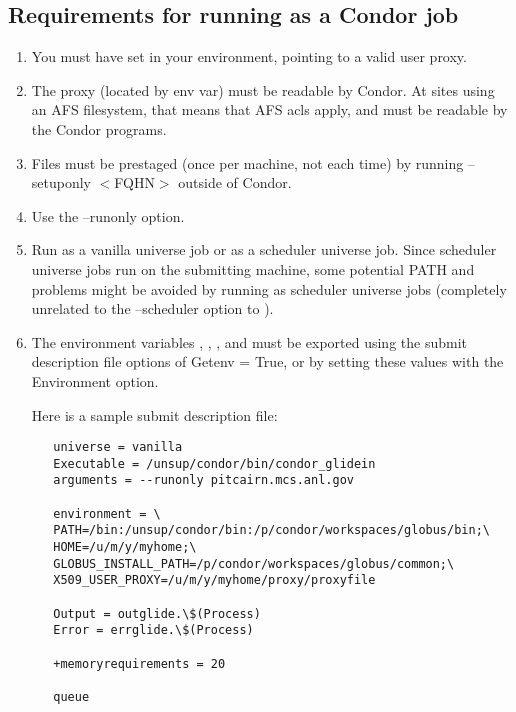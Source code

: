 \subsection{Requirements for running  as a Condor job}
\begin{enumerate}
\item You must have  set in your environment, pointing to a valid user proxy.

\item The proxy (located by  env var) must be readable by
Condor. At sites using an AFS filesystem, that means that AFS acls apply, and must be readable by the Condor programs.

\item Files must be prestaged (once per machine, not each time) by running
 --setuponly $<$FQHN$>$ outside of Condor.

\item Use the --runonly option.

\item Run  as a vanilla universe job or as a scheduler universe 
job. Since scheduler universe jobs run on the submitting machine, some potential
PATH and  problems might be avoided by running as scheduler universe jobs (completely unrelated to the --scheduler option to ).

\item The environment variables   , , , and  must be exported using the submit description file options of Getenv = True, or by setting these values with the Environment option.

Here is a sample submit description file:

\begin{verbatim}
   universe = vanilla
   Executable = /unsup/condor/bin/condor_glidein
   arguments = --runonly pitcairn.mcs.anl.gov

   environment = \
   PATH=/bin:/unsup/condor/bin:/p/condor/workspaces/globus/bin;\
   HOME=/u/m/y/myhome;\
   GLOBUS_INSTALL_PATH=/p/condor/workspaces/globus/common;\
   X509_USER_PROXY=/u/m/y/myhome/proxy/proxyfile

   Output = outglide.\$(Process)
   Error = errglide.\$(Process)

   +memoryrequirements = 20

   queue
\end{verbatim}


\end{enumerate}
